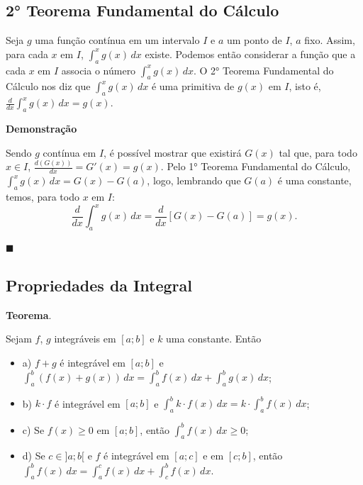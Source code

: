 \documentclass{article}
\begin{document}
{\begin{newpage}
\subsection{2° Teorema Fundamental do Cálculo}
\hspace{12pt} Seja $g$ uma função contínua em um intervalo $I$ e $a$ um ponto de $I$, $a$ fixo. Assim, para cada $x$ em $I$, $\displaystyle{\int_{a}^{x} g(x)\, dx}$ existe. Podemos então considerar a função que a cada $x$ em $I$ associa o número $\displaystyle{\int_{a}^{x} g(x)\, dx}$. O 2° Teorema Fundamental do Cálculo nos diz que $\displaystyle{\int_{a}^{x} g(x)\, dx}$ é uma primitiva de $g(x)$ em $I$, isto é, $\displaystyle{\frac{d}{dx}\int_{a}^{x} g(x)\, dx = g(x)}$.
\par\textbf{Demonstração}
\par Sendo $g$ contínua em $I$, é possível mostrar que existirá $G(x)$ tal que, para todo $x\in I$, $\displaystyle{\frac{d(G(x))}{dx} = G'(x) = g(x)}$. Pelo 1° Teorema Fundamental do Cálculo, $\displaystyle{\int_{a}^{x} g(x)\, dx = G(x) - G(a)}$, logo, lembrando que $G(a)$ é uma constante, temos, para todo $x$ em $I$:
\begin{equation*}\displaystyle{\frac{d}{dx}\int_{a}^{x} g(x)\, dx = \frac{d}{dx}[G(x) - G(a)] = g(x) .}\end{equation*}\begin{flushright}$\blacksquare $\end{flushright}
\par
\vspace{0.3cm}
\subsection{Propriedades da Integral}
\hspace{12pt} \textbf{Teorema}.\par Sejam $f$, $g$ integráveis em $[a;b]$ e $k$ uma constante. Então
\begin{itemize}
\item a) $f+g$ é integrável em $[a;b]$ e $\displaystyle{\int_{a}^{b}(f(x) + g(x))\, dx = \int_{a}^{b}f(x)\, dx + \int_{a}^{b}g(x)\, dx}$;
\item b) $k\cdot f$ é integrável em $[a;b]$ e $\displaystyle{\int_{a}^{b}k\cdot f(x)\, dx = k\cdot\int_{a}^{b} f(x)\, dx }$; 
\item c) Se $f(x)\geq 0$ em $[a;b]$, então $\displaystyle{\int_{a}^{b}f(x)\, dx \geq 0}$;
\item d) Se $c\in ]a;b[$ e $f$ é integrável em $[a;c]$ e em $[c;b]$, então
$\displaystyle{\int_{a}^{b} f(x)\, dx = \int_{a}^{c}f(x)\, dx + \int_{c}^{b} f(x)\, dx}$.
\end{itemize}
\par
\vspace{0.3cm}

\end{newpage}}
\end{document}
